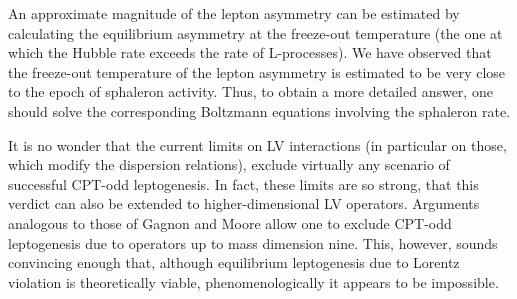 \documentclass[12pt]{revtex4}
\begin{document}
	An approximate magnitude of the lepton asymmetry can be estimated by calculating
	the equilibrium asymmetry at the freeze-out temperature (the one at which the
	Hubble rate exceeds the rate of L-processes).
	We have observed that the freeze-out temperature of the lepton asymmetry is
	estimated to be very close to the epoch of sphaleron activity.
	Thus, to obtain a more detailed answer, one should solve the corresponding 
	Boltzmann equations involving the sphaleron rate.

	It is no wonder that the current limits on LV interactions (in particular on those,
	which modify the dispersion relations), exclude virtually any scenario of successful
	CPT-odd leptogenesis.
	In fact, these limits are so strong, that this verdict can also be extended to 
	higher-dimensional LV operators.
	Arguments analogous to those of Gagnon and Moore allow one to exclude CPT-odd
	leptogenesis due to operators up to mass dimension nine.
	This, however, sounds convincing enough that, although equilibrium leptogenesis
	due to Lorentz violation is theoretically viable, phenomenologically it appears
	to be impossible.
\end{document}
